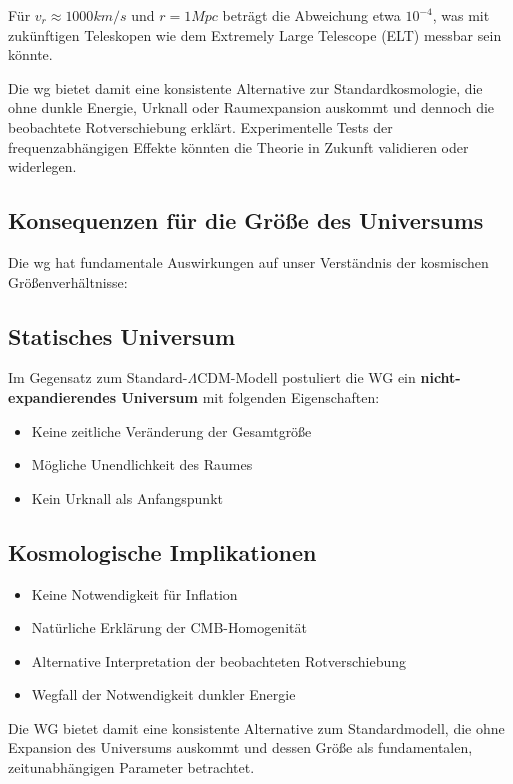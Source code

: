 Für $v_r \approx 1000 km/s$ und $r = 1 Mpc$ beträgt die Abweichung etwa $10^{-4}$, was mit zukünftigen Teleskopen wie dem Extremely Large Telescope (ELT) messbar sein könnte.

Die \gls{wg} bietet damit eine konsistente Alternative zur Standardkosmologie, die ohne dunkle Energie, Urknall oder Raumexpansion auskommt und dennoch die beobachtete Rotverschiebung erklärt.
Experimentelle Tests der frequenzabhängigen Effekte könnten die Theorie in Zukunft validieren oder widerlegen.

\subsection{Konsequenzen für die Größe des Universums}
Die \gls{wg} hat fundamentale Auswirkungen auf unser Verständnis der kosmischen Größenverhältnisse:

\subsection{Statisches Universum}
Im Gegensatz zum Standard-$\Lambda$CDM-Modell postuliert die WG ein \textbf{nicht-expandierendes Universum} mit folgenden Eigenschaften:

\begin{itemize}
\item Keine zeitliche Veränderung der Gesamtgröße
\item Mögliche Unendlichkeit des Raumes
\item Kein Urknall als Anfangspunkt
\end{itemize}

\subsection{Kosmologische Implikationen}
\begin{itemize}
\item Keine Notwendigkeit für Inflation
\item Natürliche Erklärung der CMB-Homogenität
\item Alternative Interpretation der beobachteten Rotverschiebung
\item Wegfall der Notwendigkeit dunkler Energie
\end{itemize}

Die WG bietet damit eine konsistente Alternative zum Standardmodell, die ohne Expansion des Universums auskommt und dessen Größe als fundamentalen, zeitunabhängigen Parameter betrachtet.


